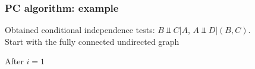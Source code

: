 \documentclass{beamer}
\begin{document}
\begin{frame}
    \frametitle{PC algorithm: example}
    \begin{flushleft}
        Obtained conditional independence tests: $B\Vbar C|A$, $A\Vbar D|(B,C)$. \\
        Start with the fully connected undirected graph 
    \end{flushleft}
    \begin{flushleft}
        After $i=1$
    \end{flushleft}
\end{frame}
\end{document}
